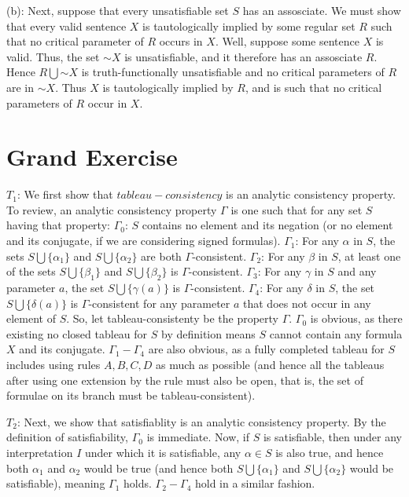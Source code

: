 \documentclass{article}
\newcommand*{\oldneg}{\mathord{\sim}}
\theoremstyle{definition}
\begin{document}
(b): Next, suppose that every unsatisfiable set $S$ has an assosciate. We must show that every valid sentence $X$ is tautologically implied by some regular set $R$ such that 
no critical parameter of $R$ occurs in $X$. Well, suppose some sentence $X$ is valid. Thus, the set ${\oldneg X}$ is unsatisfiable, and it therefore has an assosciate 
$R$. Hence $R\bigcup{\oldneg X}$ is truth-functionally unsatisfiable and no critical parameters of $R$ are in $\oldneg X$. 
Thus $X$ is tautologically implied by $R$, and is such that 
no critical parameters of $R$ occur in $X$.

\section*{Grand Exercise}
$T_1$: We first show that $tableau-consistency$ is an analytic consistency property. To review, an analytic consistency property $\Gamma$ is one such that for 
any set $S$ having that property:\newline
$\Gamma_0$: $S$ contains no element and its negation (or no element and its conjugate, if we are considering signed formulas).\newline
$\Gamma_1$: For any $\alpha$ in $S$, the sets $S\bigcup \{\alpha_1\}$ and $S\bigcup \{\alpha_2\}$ are both $\Gamma$-consistent.\newline
$\Gamma_2$: For any $\beta$ in $S$, at least one of the sets $S\bigcup \{\beta_1\}$ and $S\bigcup \{\beta_2\}$ is $\Gamma$-consistent.\newline
$\Gamma_3$: For any $\gamma$ in $S$ and any parameter $a$, the set $S\bigcup \{\gamma\left(a\right)\}$ is $\Gamma$-consistent.\newline
$\Gamma_4$: For any $\delta$ in $S$, the set $S\bigcup \{\delta\left(a\right)\}$ is $\Gamma$-consistent for any parameter $a$ that does not occur in 
any element of $S$.\newline
So, let tableau-consistenty be the property $\Gamma$. $\Gamma_0$ is obvious, as there existing no closed tableau for $S$ by definition means $S$ cannot contain 
any formula $X$ and its conjugate. $\Gamma_1-\Gamma_4$ are also obvious, as a fully completed tableau for $S$ includes using rules $A,B,C,D$ as much as 
possible (and hence all the tableaus after using one extension by the rule must also be open, that is, the set of formulae on its branch must be 
tableau-consistent).


$T_2$: Next, we show that satisfiablity is an analytic consistency property. By the definition of satisfiability, $\Gamma_0$ is immediate. Now, if 
$S$ is satisfiable, then under any interpretation $I$ under which it is satisfiable, any $\alpha\in S$ is also true, and hence both $\alpha_1$ and $\alpha_2$ 
would be true (and hence both $S\bigcup \{\alpha_1\}$ and $S\bigcup \{\alpha_2\}$ would be satisfiable), meaning $\Gamma_1$ holds. $\Gamma_2-\Gamma_4$ hold in a similar fashion.
\end{document}
